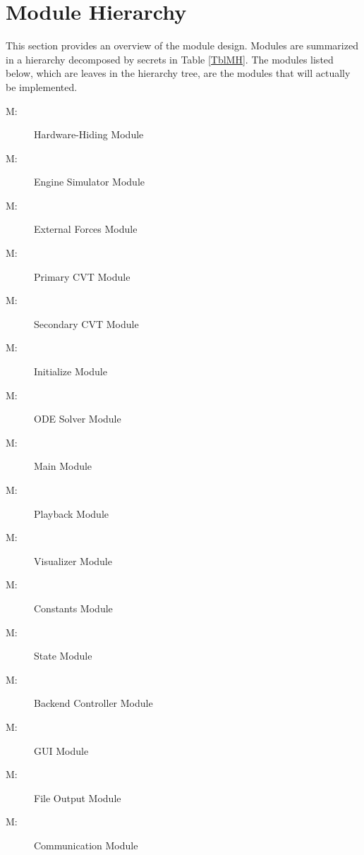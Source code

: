 \documentclass[12pt, titlepage]{article}
\newcounter{mnum}
\newcommand{\mthemnum}{M\themnum}
\begin{document}
\section{Module Hierarchy} \label{SecMH}

This section provides an overview of the module design. Modules are summarized
in a hierarchy decomposed by secrets in Table \ref{TblMH}. The modules listed
below, which are leaves in the hierarchy tree, are the modules that will
actually be implemented.

\begin{description}
  \item [ \mthemnum \label{mHH}:] Hardware-Hiding Module
  \item [ \mthemnum \label{mEngineSim}:] Engine Simulator Module
  \item [ \mthemnum \label{mExternalForces}:] External Forces Module
  \item [ \mthemnum \label{mPrimCVT}:] Primary CVT Module
  \item [ \mthemnum \label{mSecCVT}:] Secondary CVT Module
  \item [ \mthemnum \label{mInitialize}:] Initialize Module
  \item [ \mthemnum \label{mODESolver}:] ODE Solver Module
  \item [ \mthemnum \label{mMain}:] Main Module
  \item [ \mthemnum \label{mPlayback}:] Playback Module
  \item [ \mthemnum \label{mVisualizer}:] Visualizer Module
  \item [ \mthemnum \label{mConstants}:] Constants Module
  \item [ \mthemnum \label{mState}:] State Module
  \item [ \mthemnum \label{mBCM}:] Backend Controller Module
  \item [ \mthemnum \label{mGUI}:] GUI Module
  \item [ \mthemnum \label{mFileOutput}:] File Output Module
  \item [ \mthemnum \label{mComm}:] Communication Module
  \end{description}
\end{document}
